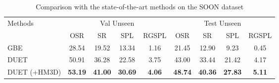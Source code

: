  
\begin{table}[t]
\centering
\scriptsize
\tabcolsep=0.1cm
\caption{Comparison with the state-of-the-art methods on the SOON dataset}
\label{tab:soon_sota_cmpr}
\begin{tabular}{l|cccc|cccc} \toprule
\multirow{2}{*}{Methods} & \multicolumn{4}{c|}{Val Unseen} & \multicolumn{4}{c}{Test Unseen} \\
 & OSR & SR & SPL & RGSPL & OSR & SR & SPL & RGSPL \\ \midrule
GBE \cite{zhu2021soon} & 28.54 & 19.52 & 13.34 & 1.16 & 21.45 & 12.90 & 9.23 & 0.45 \\
DUET \cite{chen2022duet} & 50.91 & 36.28 & 22.58 & 3.75 & 43.00 & 33.44 & 21.42 & 4.17 \\  \midrule
DUET (+HM3D) & \textbf{53.19} & \textbf{41.00} & \textbf{30.69} & \textbf{4.06}  & \textbf{48.74} & \textbf{40.36} & \textbf{27.83} & \textbf{5.11} \\ \bottomrule
\end{tabular}
\end{table}

